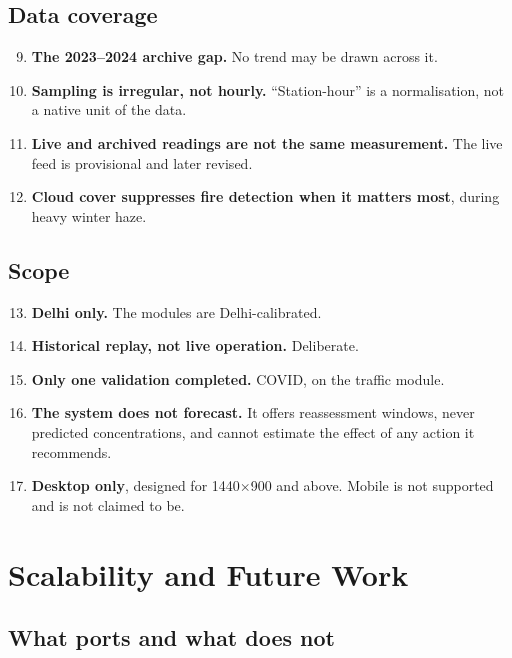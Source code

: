 \documentclass[11pt,a4paper]{article}
\begin{document}
\subsection{Data coverage}

\begin{enumerate}\setcounter{enumi}{8}
  \item \textbf{The 2023--2024 archive gap.} No trend may be drawn across it.
  \item \textbf{Sampling is irregular, not hourly.} ``Station-hour'' is a
  normalisation, not a native unit of the data.
  \item \textbf{Live and archived readings are not the same measurement.} The live
  feed is provisional and later revised.
  \item \textbf{Cloud cover suppresses fire detection when it matters most}, during
  heavy winter haze.
\end{enumerate}

\subsection{Scope}

\begin{enumerate}\setcounter{enumi}{12}
  \item \textbf{Delhi only.} The modules are Delhi-calibrated.
  \item \textbf{Historical replay, not live operation.} Deliberate.
  \item \textbf{Only one validation completed.} COVID, on the traffic module.
  \item \textbf{The system does not forecast.} It offers reassessment windows, never
  predicted concentrations, and cannot estimate the effect of any action it
  recommends.
  \item \textbf{Desktop only}, designed for 1440$\times$900 and above. Mobile is not
  supported and is not claimed to be.
\end{enumerate}

\section{Scalability and Future Work}

\subsection{What ports and what does not}
\end{document}
